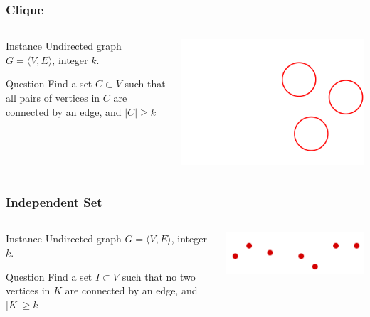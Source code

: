 \documentclass[12pt,aspectratio=169]{beamer}
\begin{document}
\begin{frame}\frametitle{Clique }
\begin{columns} 
  \begin{column}{0.48\textwidth}
  \begin{block}{Instance}
    Undirected graph $G=\langle V,E \rangle$, integer $k$.
  \end{block}
  \begin{block}{Question}
    Find a set $C\subset V$ such that all pairs of vertices in $C$ are connected by an edge, and $|C|\ge k$
  \end{block}
\end{column}
    
    \begin{column}{0.48\textwidth}
      \centering

  \includegraphics[height=0.5\textheight]{img/6n-graf-clique}
\end{column}
\end{columns}
\end{frame}

\begin{frame}\frametitle{Independent Set }
\begin{columns} 
  \begin{column}{0.48\textwidth}
  \begin{block}{Instance}
    Undirected graph $G=\langle V,E \rangle$, integer $k$.
  \end{block}
  \begin{block}{Question}
    Find a set $I\subset V$ such that no two vertices in $K$ are connected by an edge, and $|K|\ge k$
  \end{block}
\end{column}
    
    \begin{column}{0.48\textwidth}
      \centering
  \includegraphics[height=0.2\textheight]{img/Vertex-cover}
\end{column}
\end{columns}
\end{frame}
\end{document}
